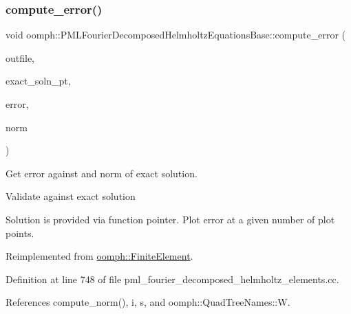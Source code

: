 \subsubsection{\texorpdfstring{compute\+\_\+error()}{compute\_error()}\hspace{0.1cm}{\footnotesize\ttfamily [1/2]}}
{\footnotesize\ttfamily void oomph\+::\+P\+M\+L\+Fourier\+Decomposed\+Helmholtz\+Equations\+Base\+::compute\+\_\+error (\begin{DoxyParamCaption}\item[{std\+::ostream \&}]{outfile,  }\item[{\hyperlink{classoomph_1_1FiniteElement_a690fd33af26cc3e84f39bba6d5a85202}{Finite\+Element\+::\+Steady\+Exact\+Solution\+Fct\+Pt}}]{exact\+\_\+soln\+\_\+pt,  }\item[{double \&}]{error,  }\item[{double \&}]{norm }\end{DoxyParamCaption})\hspace{0.3cm}{\ttfamily [virtual]}}



Get error against and norm of exact solution. 

Validate against exact solution

Solution is provided via function pointer. Plot error at a given number of plot points. 

Reimplemented from \hyperlink{classoomph_1_1FiniteElement_a73c79a1f1e5b1d334757812a6bbd58ff}{oomph\+::\+Finite\+Element}.



Definition at line 748 of file pml\+\_\+fourier\+\_\+decomposed\+\_\+helmholtz\+\_\+elements.\+cc.



References compute\+\_\+norm(), i, s, and oomph\+::\+Quad\+Tree\+Names\+::W.

\mbox{\label{classoomph_1_1PMLFourierDecomposedHelmholtzEquationsBase_af763ba67459975b5afbc5933c248272d}} 
